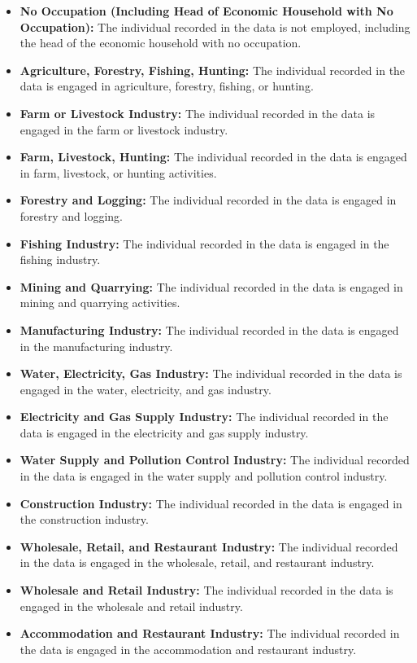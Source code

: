 \documentclass[twocolumn]{article}
\begin{document}
\begin{itemize}
    \item \textbf{No Occupation (Including Head of Economic Household with No Occupation):} The individual recorded in the data is not employed, including the head of the economic household with no occupation.
    \item \textbf{Agriculture, Forestry, Fishing, Hunting:} The individual recorded in the data is engaged in agriculture, forestry, fishing, or hunting.
    \item \textbf{Farm or Livestock Industry:} The individual recorded in the data is engaged in the farm or livestock industry.
    \item \textbf{Farm, Livestock, Hunting:} The individual recorded in the data is engaged in farm, livestock, or hunting activities.
    \item \textbf{Forestry and Logging:} The individual recorded in the data is engaged in forestry and logging.
    \item \textbf{Fishing Industry:} The individual recorded in the data is engaged in the fishing industry.
    \item \textbf{Mining and Quarrying:} The individual recorded in the data is engaged in mining and quarrying activities.
    \item \textbf{Manufacturing Industry:} The individual recorded in the data is engaged in the manufacturing industry.
    \item \textbf{Water, Electricity, Gas Industry:} The individual recorded in the data is engaged in the water, electricity, and gas industry.
    \item \textbf{Electricity and Gas Supply Industry:} The individual recorded in the data is engaged in the electricity and gas supply industry.
    \item \textbf{Water Supply and Pollution Control Industry:} The individual recorded in the data is engaged in the water supply and pollution control industry.
    \item \textbf{Construction Industry:} The individual recorded in the data is engaged in the construction industry.
    \item \textbf{Wholesale, Retail, and Restaurant Industry:} The individual recorded in the data is engaged in the wholesale, retail, and restaurant industry.
    \item \textbf{Wholesale and Retail Industry:} The individual recorded in the data is engaged in the wholesale and retail industry.
    \item \textbf{Accommodation and Restaurant Industry:} The individual recorded in the data is engaged in the accommodation and restaurant industry.

\end{itemize}
\end{document}
